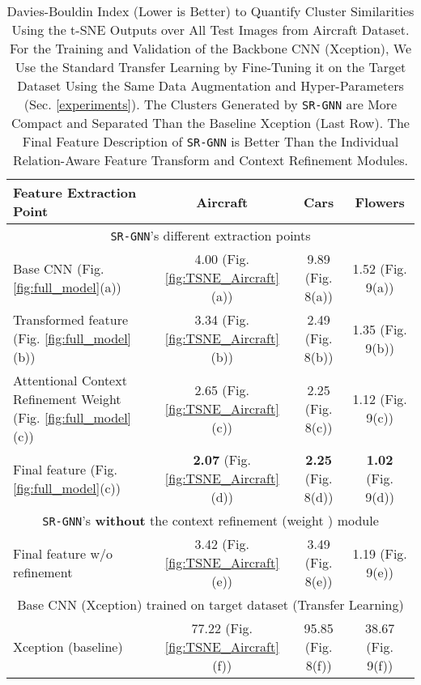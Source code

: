 \documentclass[journal]{IEEEtran}
\begin{document}
\begin{table*}
\begin{center}
\vspace{ -0.2 cm}
\caption{Davies-Bouldin \cite{davies1979cluster} Index (Lower is Better) to Quantify Cluster Similarities Using the t-SNE \cite{van2014accelerating} Outputs over All Test Images from Aircraft 
Dataset. For the Training and Validation of the Backbone CNN (Xception), We Use the Standard Transfer Learning by Fine-Tuning it on the Target Dataset Using the Same Data Augmentation and Hyper-Parameters (Sec. \ref{experiments}). The Clusters Generated by \texttt{SR-GNN} are More Compact and Separated Than the Baseline Xception (Last Row). The Final Feature Description of \texttt{SR-GNN} is Better Than the Individual Relation-Aware Feature Transform  and Context Refinement Modules. }
\begin{tabular}{|l| c c c|}
 \hline
Feature Extraction Point & Aircraft & Cars & Flowers\\
    \toprule
    \multicolumn{4}{|c|}{\texttt{SR-GNN}'s different extraction points}\\
    \midrule
   Base CNN (Fig. \ref{fig:full_model}(a)) &  4.00 (Fig. \ref{fig:TSNE_Aircraft}(a))  & 9.89 (Fig. 8(a)) & 1.52 (Fig. 9(a))\\
   Transformed feature  (Fig. \ref{fig:full_model}(b)) &  3.34 (Fig. \ref{fig:TSNE_Aircraft}(b))  & 2.49 (Fig. 8(b))& 1.35 (Fig. 9(b))\\
   Attentional Context Refinement Weight  (Fig. \ref{fig:full_model}(c)) &  2.65  (Fig. \ref{fig:TSNE_Aircraft}(c)) & 2.25 (Fig. 8(c))  & 1.12 (Fig. 9(c))\\
   Final feature   (Fig. \ref{fig:full_model}(c)) &  \textbf{2.07} (Fig. \ref{fig:TSNE_Aircraft}(d)) & \textbf{2.25} (Fig. 8(d)) & \textbf{1.02} (Fig. 9(d))\\
   \midrule
   \multicolumn{4}{|c|}{\texttt{SR-GNN}'s  \textbf{without} the context refinement (weight ) module}\\
    \midrule
   Final feature w/o refinement  &  3.42 (Fig. \ref{fig:TSNE_Aircraft}(e)) & 3.49 (Fig. 8(e)) & 1.19 (Fig. 9(e))\\
   \midrule
   \multicolumn{4}{|c|}{Base CNN (Xception) trained on target dataset (Transfer Learning)}\\
    \midrule
   Xception (baseline)  & 77.22 (Fig. \ref{fig:TSNE_Aircraft}(f)) & 95.85 (Fig. 8(f)) & 38.67 (Fig. 9(f))  \\
   \bottomrule
\end{tabular}
 \label{table:davies_bouldin_score}
 \end{center}
 \vspace{-0.5 cm}
\end{table*}
\end{document}
